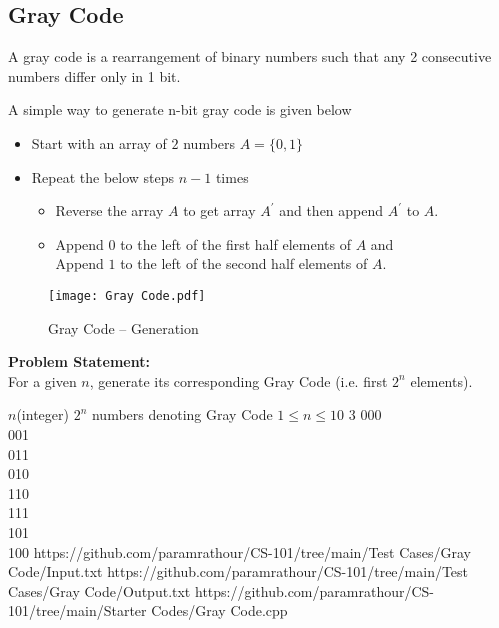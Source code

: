 \documentclass[../../Problems]{subfiles}
\begin{document}
\subsection{Gray Code}
A gray code is a rearrangement of binary numbers such that any 2 consecutive numbers differ only in 1 bit.

A simple way to generate n-bit gray code is given below
\begin{itemize}	
	\item Start with an array of $2$ numbers $A = \{0, 1\}$
	\item Repeat the below steps $n-1$ times
	\begin{itemize}
		\item Reverse the array $A$ to get array $A^\prime$  and then append $A^\prime$  to $A$.
		\item Append $0$ to the left of the first half elements of $A$ and\\
		Append $1$ to the left of the second half elements of $A$.
	\end{itemize}
\end{itemize}
\begin{figure}[H]
	\centering
	\texttt{[image: Gray Code.pdf]}
	\caption{Gray Code -- Generation}
\end{figure}
\vspace{-2em}
\textbf{Problem Statement:}\\
For a given $n$, generate its corresponding Gray Code (i.e. first $2^n$ elements).
\begin{testcasesMore}
	{$n$\hfill(integer)}
	{$2^n$ numbers denoting Gray Code}
	{$1 \leq n \leq 10$}
	{3}
	{000\\001\\011\\010\\110\\111\\101\\100}
	{https://github.com/paramrathour/CS-101/tree/main/Test Cases/Gray Code/Input.txt}
	{https://github.com/paramrathour/CS-101/tree/main/Test Cases/Gray Code/Output.txt}
	{https://github.com/paramrathour/CS-101/tree/main/Starter Codes/Gray Code.cpp}
\end{testcasesMore}
\end{document}
